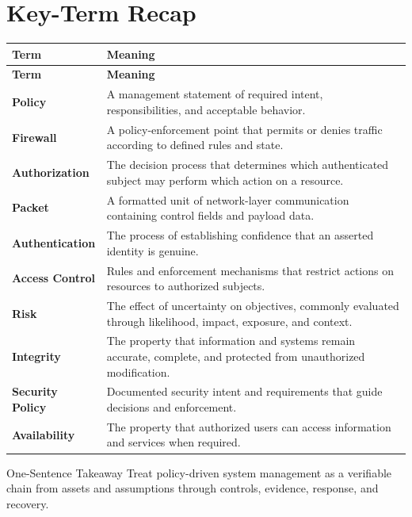 \documentclass[11pt,letterpaper]{article}
\begin{document}
\section*{Key-Term Recap}
\begin{longtable}{>{\raggedright\arraybackslash}p{}>{\raggedright\arraybackslash}p{}}
\toprule\rowcolor{Navy}\color{white}\textbf{Term} & \color{white}\textbf{Meaning}\\\midrule
\endfirsthead
\toprule\rowcolor{Navy}\color{white}\textbf{Term} & \color{white}\textbf{Meaning}\\\midrule
\endhead
\textbf{Policy} & A management statement of required intent, responsibilities, and acceptable behavior. \\\midrule
\textbf{Firewall} & A policy-enforcement point that permits or denies traffic according to defined rules and state. \\\midrule
\textbf{Authorization} & The decision process that determines which authenticated subject may perform which action on a resource. \\\midrule
\textbf{Packet} & A formatted unit of network-layer communication containing control fields and payload data. \\\midrule
\textbf{Authentication} & The process of establishing confidence that an asserted identity is genuine. \\\midrule
\textbf{Access Control} & Rules and enforcement mechanisms that restrict actions on resources to authorized subjects. \\\midrule
\textbf{Risk} & The effect of uncertainty on objectives, commonly evaluated through likelihood, impact, exposure, and context. \\\midrule
\textbf{Integrity} & The property that information and systems remain accurate, complete, and protected from unauthorized modification. \\\midrule
\textbf{Security Policy} & Documented security intent and requirements that guide decisions and enforcement. \\\midrule
\textbf{Availability} & The property that authorized users can access information and services when required. \\\midrule
\bottomrule
\end{longtable}
\begin{CornellExamBox}{One-Sentence Takeaway}
Treat policy-driven system management as a verifiable chain from assets and assumptions through controls, evidence, response, and recovery.
\end{CornellExamBox}
\end{document}
